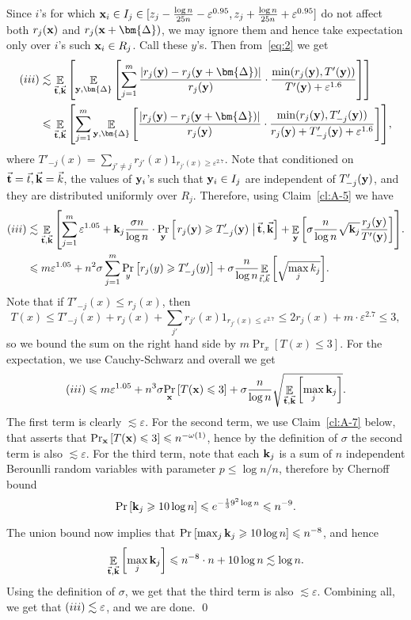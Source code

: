 \documentclass[10pt,a4paper]{article}
\newcommand\Prob[2]{{\Pr_{#1}\left[ {#2} \right]}}
\newcommand\cProb[3]{{\Pr_{#1}\left[ \left. #3 \;\right\vert #2 \right]}}
\newcommand\Expect[2]{{\mathop{\mathbb{E}}_{#1}\left[ {#2} \right]}}
\newcommand\eps{\varepsilon}
\renewcommand\geq{\geqslant}
\renewcommand\ge{\geqslant}
\renewcommand\leq{\leqslant}
\newcommand{\rom}[1]{\uppercase\expandafter{\romannumeral #1\relax}}
\newcommand{\De}{\Delta}
\def\ll{\lesssim}
\begin{document}
Since $i$'s for which ${\bf x}_i\in I_j\in [z_j-\frac{\log n}{25 n}-\eps^{0.95},z_j+\frac{\log n}{25n}+\eps^{0.95}]$
do not affect both $r_j({\bf x})$ and $r_j({\bf x}+\bm{\De})$, we may ignore them and hence take expectation only over $i$'s such
${\bf x}_i\in R_j$. Call these $y$'s. Then from~\eqref{eq:2} we get
\begin{align*}
(\rom{3})
&\ll
\Expect{\vec{{\bf t}},\vec{{\bf k}}}
{
\Expect{{\bf y},\bm{\De}}
{
\sum\limits_{j=1}^{m} \frac{|r_j({\bf y}) - r_j({\bf y}+\bm{\De})|}{r_j({\bf y})} \cdot \frac{\min(r_j({\bf y}), T'({\bf y}))}{T'({\bf y})+\eps^{1.6}}
}}\\
&\leq
\Expect{\vec{{\bf t}},\vec{{\bf k}}}
{
\sum\limits_{j=1}^{m}
\Expect{{\bf y},\bm{\De}}
{\frac{|r_j({\bf y}) - r_j({\bf y}+\bm{\De})|}{r_j({\bf y})} \cdot \frac{\min(r_j({\bf y}), T'_{-j}({\bf y}))}{r_j({\bf y})+T'_{-j}({\bf y})+\eps^{1.6}}
}},
\end{align*}
where $T'_{-j}(x) = \sum\limits_{j'\neq j}r_{j'}(x) 1_{r_{j'}(x)\geq \eps^{2.7}}$.
Note that conditioned on $\vec{{\bf t}}= \vec{t},\vec{{\bf k}} = \vec{k}$, the values of ${\bf y}_i$'s such that ${\bf y}_i\in I_j$ are independent of $T'_{-j}({\bf y})$,
and they are distributed uniformly over $R_j$. Therefore, using Claim~\ref{cl:A-5} we have
\begin{align*}
(\rom{3})
&\ll
\Expect{\vec{{\bf t}},\vec{{\bf k}}}{
\sum\limits_{j=1}^{m}
\eps^{1.05}+ {\bf k}_j\frac{\sigma n}{\log n}  \cdot \cProb{{\bf y}}{\vec{{\bf t}},\vec{{\bf k}}}{r_j({\bf y})\ge T'_{-j}({\bf y})}
+\Expect{{\bf y}}{\sigma \frac{n}{\log n}\sqrt{{\bf k}_j}\frac{r_j({\bf y}) }{T'({\bf y})}}
}.\\
&\leq
m\eps^{1.05}
+ n^2\sigma
\sum\limits_{j=1}^{m}\Prob{y}{r_j(y)\ge T'_{-j}(y)}
+ \sigma\frac{n}{\log n}
\Expect{\vec{t},\vec{k}}{\sqrt{\max_{j} k_j}}.
\end{align*}
Note that if $T'_{-j}(x)\leq r_j(x)$, then
\[
T(x) \leq
T'_{-j}(x) + r_j(x) + \sum\limits_{j'}{r_{j'}(x) 1_{r_{j'}(x)\leq \eps^{2.7}}}
\leq 2r_j(x) + m\cdot \eps^{2.7}
\leq 3,
\]
so we bound the sum on the right hand side by $m\Prob{x}{T(x)\leq 3}$. For the expectation,
we use Cauchy-Schwarz and overall we get
\[
(\rom{3})
\leq m\eps^{1.05} + n^3\sigma \Prob{{\bf x}}{T({\bf x})\leq 3} +
\sigma\frac{n}{\log n}\sqrt{\Expect{\vec{{\bf t}},\vec{{\bf k}}}{\max_{j} {{\bf k}_j}}}.
\]
The first term is clearly $\ll \eps$. For the second term, we use Claim~\ref{cl:A-7} below, that asserts that
$\Prob{{\bf x}}{T({\bf x})\leq 3}\leq n^{-\omega(1)}$, hence by the definition of $\sigma$ the second term is
also $\ll \eps$. For the third term, note that each ${\bf k}_j$ is a sum of $n$ independent Berounlli random variables
with parameter $p\leq\log n/n$, therefore by Chernoff bound
\[
\Prob{}{{\bf k}_j\geq 10\log n}
\leq e^{-\frac{1}{3}9^2 \log n}
\leq n^{-9}.
\]
The union bound now implies that $\Prob{}{\max_j {\bf k}_j\geq 10\log n}\leq n^{-8}$, and hence
\[
\Expect{\vec{{\bf t}},\vec{{\bf k}}}{\max_{j} {\bf k}_j}
\leq n^{-8}\cdot n + 10\log n\ll \log n.
\]
Using the definition of $\sigma$, we get that the third term is also $\ll \eps$. Combining all,
we get that $(\rom{3})\ll \eps$, and we are done.
\qed
\end{document}
